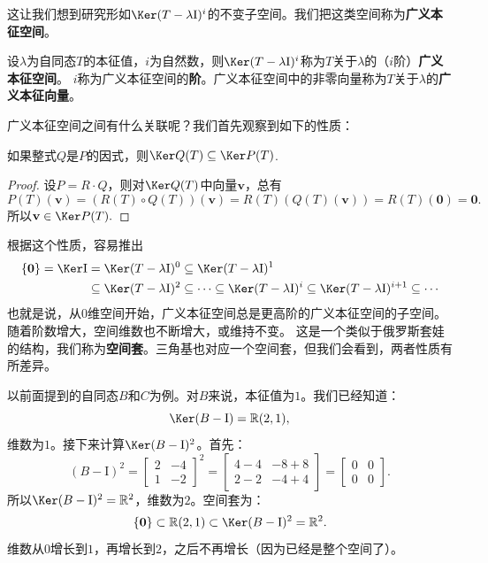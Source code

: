\documentclass[12pt,UTF8,fontset=none]{ctexbook}
\begin{document}
这让我们想到研究形如$\Ker (T - \lambda\mathrm{I})^i$的不变子空间。我们把这类空间称为\textbf{广义本征空间}。

\begin{df}\label{df:6_4}
    设$\lambda$为自同态$T$的本征值，$i$为自然数，则$\Ker (T - \lambda\mathrm{I})^i$称为$T$关于$\lambda$的（$i$阶）\textbf{广义本征空间}。
    $i$称为广义本征空间的\textbf{阶}。广义本征空间中的非零向量称为$T$关于$\lambda$的\textbf{广义本征向量}。
\end{df}

广义本征空间之间有什么关联呢？我们首先观察到如下的性质：
\begin{pp}\label{pp:6_12_1}
    如果整式$Q$是$P$的因式，则$\Ker Q(T) \subseteq \Ker P(T)$.
\end{pp}
\begin{proof} %
    设$P = R \cdot Q$，则对$\Ker Q(T)$中向量$\mathbf{v}$，总有
    $$P(T)(\mathbf{v}) = (R(T)\circ Q(T))(\mathbf{v}) = R(T)(Q(T)(\mathbf{v})) = R(T)(\mathbf{0}) = \mathbf{0}. $$
    所以$\mathbf{v} \in \Ker P(T).$

\end{proof}

根据这个性质，容易推出
\begin{align*}
    \{\mathbf{0}\} = \Ker \mathrm{I} &= \Ker (T - \lambda\mathrm{I})^0 \subseteq \Ker (T - \lambda\mathrm{I})^1  \\
    &\subseteq \Ker (T - \lambda\mathrm{I})^2 \subseteq \cdots \subseteq \Ker (T - \lambda\mathrm{I})^i \subseteq \Ker (T - \lambda\mathrm{I})^{i+1} \subseteq \cdots 
\end{align*}
也就是说，从0维空间开始，广义本征空间总是更高阶的广义本征空间的子空间。随着阶数增大，空间维数也不断增大，或维持不变。
这是一个类似于俄罗斯套娃的结构，我们称为\textbf{空间套}。三角基也对应一个空间套，但我们会看到，两者性质有所差异。

以前面提到的自同态$B$和$C$为例。对$B$来说，本征值为$1$。我们已经知道：
$$
\Ker(B - \mathrm{I}) = \mathbb{R}(2,1),
$$
维数为$1$。接下来计算$\Ker(B - \mathrm{I})^2$。首先：
$$
(B - \mathrm{I})^2 = \begin{bmatrix} 2 & -4 \\ 1 & -2 \end{bmatrix}^2 = \begin{bmatrix} 4-4 & -8+8 \\ 2-2 & -4+4 \end{bmatrix} = \begin{bmatrix} 0 & 0 \\ 0 & 0 \end{bmatrix}.
$$
所以$\Ker(B - \mathrm{I})^2 = \mathbb{R}^2$，维数为$2$。空间套为：
$$
\{\mathbf{0}\} \subset \mathbb{R}(2,1) \subset \Ker(B - \mathrm{I})^2 = \mathbb{R}^2.
$$
维数从$0$增长到$1$，再增长到$2$，之后不再增长（因为已经是整个空间了）。
\end{document}
